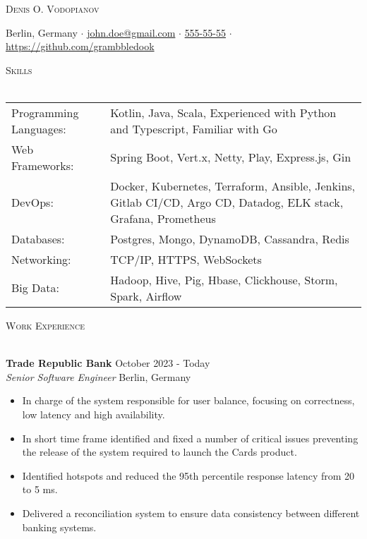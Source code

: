 \documentclass[a4paper]{article}
\makeatletter
\newcommand{\lineunder} {
    \vspace*{-8pt} \\
    \hspace*{-18pt} \hrulefill \\
}
\newcommand{\header} [1] {
        {\hspace*{-18pt}\vspace*{6pt} \textsc{#1}}
    \vspace*{-6pt} \lineunder
}
\newcommand{\employer} [4] {
    \textbf{#1} \hfill {#3} \\
    \textit{#2} \hfill {#4} \\
    \vspace{0mm}
}
\def\email{john.doe@gmail.com}
\def\phone{555-55-55}
\makeatother
\begin{document}
    \vspace*{-40pt}


    \vspace*{-10pt}
    \begin{center}
        \Huge \scshape {Denis O. Vodopianov} \\ \vspace{1mm}
    \end{center}

    \begin{center}
        Berlin, Germany $\cdot$ \href{mailto:\email}{\email} $\cdot$ \href{tel:\phone}{\phone} $\cdot$ \url{https://github.com/grambbledook}\\
    \end{center}

    \header{Skills}
    \begin{tabular}{V{5cm} @{\hskip 0.6cm} V{16cm}}
        Programming Languages: & Kotlin, Java,  Scala, Experienced with Python and Typescript, Familiar with Go                                 \\
        Web Frameworks:        & Spring Boot, Vert.x, Netty, Play, Express.js, Gin                                                            \\
        DevOps:                & Docker, Kubernetes, Terraform, Ansible, Jenkins, Gitlab CI/CD, Argo CD, Datadog, ELK stack, Grafana, Prometheus \\
        Databases:             & Postgres, Mongo, DynamoDB, Cassandra, Redis                                                                         \\
        Networking:            & TCP/IP, HTTPS, WebSockets                                                                                    \\
        Big Data:              & Hadoop, Hive, Pig, Hbase, Clickhouse, Storm, Spark, Airflow                                                  \\
    \end{tabular}
    \vspace{2mm}


    \header{Work Experience}
    \vspace{1mm}

    \employer{Trade Republic Bank}{Senior Software Engineer}{October 2023 - Today}{Berlin, Germany}
    \begin{itemize}[itemsep=-1mm]
        \item In charge of the system responsible for user balance, focusing on correctness, low latency and high availability.
        \item In short time frame identified and fixed a number of critical issues preventing the release of the system required to launch the Cards product.
        \item Identified hotspots and reduced the 95th percentile response latency from 20 to 5 ms.
        \item Delivered a reconciliation system to ensure data consistency between different banking systems.
    \end{itemize}
\end{document}
